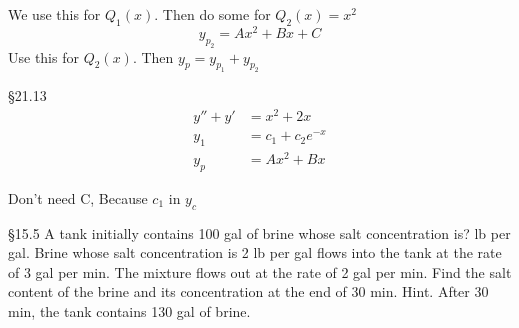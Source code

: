 \begin{rvw}
\begin{ex}
\begin{note}
We use this for $Q_1(x)$. Then do some for $Q_2(x)=x^2$ $$y_{p_2}=Ax^2+Bx+C$$ Use this for $Q_2(x)$. Then $y_p=y_{p_1}+y_{p_2}$
\end{note}
\end{ex}
\begin{ex}
\S 21.13
\begin{align*}
    y''+y'&=x^2+2x\\
    y_1&=c_1+c_2e^{-x}\\
    y_p&=Ax^2+Bx
\end{align*}
\begin{note}
Don't need C, Because $c_1$ in $y_c$
\end{note}
\end{ex}
\begin{ex}
\S 15.5 A tank initially contains 100 gal of brine whose salt concentration is? lb per gal. Brine whose salt concentration is 2 lb per gal flows into the tank at the rate of 3 gal per min. The mixture flows out at the rate of 2 gal per min. Find the salt content of the brine and its concentration at the end of 30 min. Hint. After 30 min, the tank contains 130 gal of brine.
\end{ex}
\end{rvw}